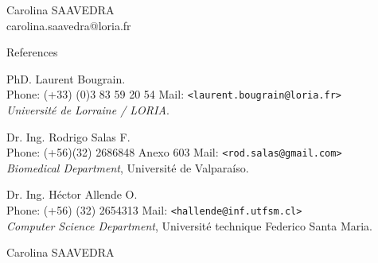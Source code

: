 \documentclass[letterpaper]{article}
\begin{document}
\begin{cv}{{\huge Carolina SAAVEDRA}\\
carolina.saavedra@loria.fr}
 \begin{cvlist}{References}
 \item PhD. Laurent Bougrain.\\
 Phone: (+33) (0)3 83 59 20 54  Mail: \texttt{<laurent.bougrain@loria.fr>}\\
 \emph{Université de Lorraine / LORIA}.

 \item Dr. Ing. Rodrigo Salas F.\\
 Phone: (+56)(32) 2686848 Anexo 603 Mail: \texttt{<rod.salas@gmail.com>}\\
 \emph{Biomedical Department}, Université de Valparaíso.
 
 \item Dr. Ing. Héctor Allende O.\\
 Phone: (+56) (32) 2654313 Mail: \texttt{<hallende@inf.utfsm.cl>}\\
 \emph{Computer Science Department}, Université technique Federico
 Santa Maria.
\end{cvlist}



\end{cv}
\vfill
\hfill Carolina SAAVEDRA
\end{document}
